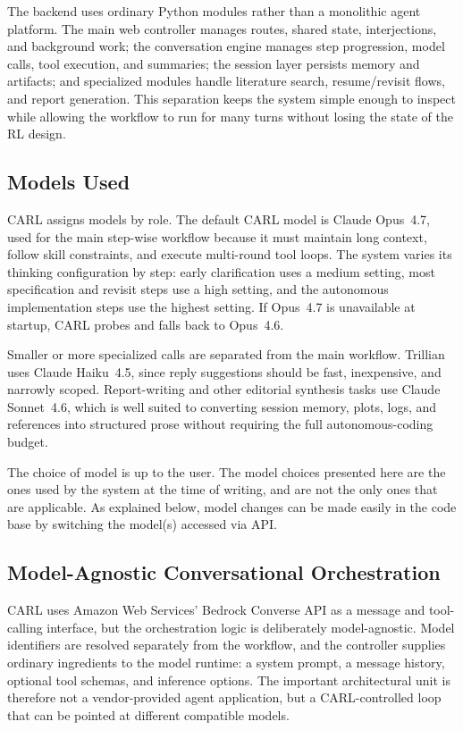 \documentclass[mnsc,sglanonrev]{informs4}
\begin{document}
The backend uses ordinary Python modules rather than a monolithic agent platform. The main web controller manages routes, shared state, interjections, and background work; the conversation engine manages step progression, model calls, tool execution, and summaries; the session layer persists memory and artifacts; and specialized modules handle literature search, resume/revisit flows, and report generation. This separation keeps the system simple enough to inspect while allowing the workflow to run for many turns without losing the state of the RL design.

\subsection{Models Used} \label{sec:carl_models}

CARL assigns models by role. The default CARL model is Claude Opus~4.7, used for the main step-wise workflow because it must maintain long context, follow skill constraints, and execute multi-round tool loops. The system varies its thinking configuration by step: early clarification uses a medium setting, most specification and revisit steps use a high setting, and the autonomous implementation steps use the highest setting. If Opus~4.7 is unavailable at startup, CARL probes and falls back to Opus~4.6.

Smaller or more specialized calls are separated from the main workflow. Trillian uses Claude Haiku~4.5, since reply suggestions should be fast, inexpensive, and narrowly scoped. Report-writing and other editorial synthesis tasks use Claude Sonnet~4.6, which is well suited to converting session memory, plots, logs, and references into structured prose without requiring the full autonomous-coding budget.

The choice of model is up to the user. The model choices presented here are the ones used by the system at the time of writing, and are not the only ones that are applicable. As explained below, model changes can be made easily in the code base by switching the model(s) accessed via API.

\subsection{Model-Agnostic Conversational Orchestration}

CARL uses Amazon Web Services' Bedrock Converse API as a message and tool-calling interface, but the orchestration logic is deliberately model-agnostic. Model identifiers are resolved separately from the workflow, and the controller supplies ordinary ingredients to the model runtime: a system prompt, a message history, optional tool schemas, and inference options. The important architectural unit is therefore not a vendor-provided agent application, but a CARL-controlled loop that can be pointed at different compatible models.
\end{document}
